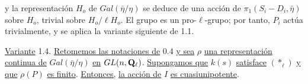 y la representación $H_o$ de $Gal(\bar{\eta}/\eta)$ se deduce de una acción de $\pi_1(S_i-D_i,\bar{\eta})$ sobre $H_o$, trivial sobre $H_o/\ell H_o$. El grupo  es un pro-$\ell$-grupo; por tanto, $P_i$ actúa trivialmente, y se aplica la variante siguiente de 1.1.

\underline{Variante} 1.4.  \underline{Retomemos las notaciones de} 0.4 \underline{y sea} $\rho$ \underline{una representación continua de} $Gal(\bar{\eta}/\eta)$ \underline{en} $\sisi{Gal}{GL}(n,\mathbf{Q}_\ell)$. \underline{Supongamos que} $k(s)$ \underline{satisface} $(\ast_\ell)$ \underline{y que} $\rho(P)$ \underline{es finito}. \underline{Entonces,} \underline{la acción de} $I$ \underline{es cuasiunipotente}.


